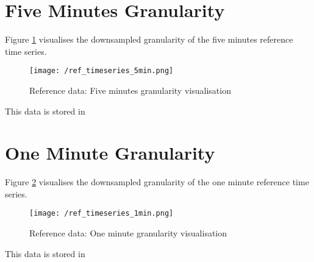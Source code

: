 \clearpage
\section{Five Minutes Granularity}

Figure \ref{fig:ref_ts_5_m_granularity} visualises the downsampled granularity of the five minutes reference time series.

\begin{figure}[h!]
	\texttt{[image: /ref\_timeseries\_5min.png]}
	\caption{Reference data: Five minutes granularity visualisation}
	\label{fig:ref_ts_5_m_granularity}
\end{figure}

This data is stored in 



\clearpage
\section{One Minute Granularity}

Figure \ref{fig:ref_ts_1_m_granularity} visualises the downsampled granularity of the one minute reference time series.

\begin{figure}[h!]
	\texttt{[image: /ref\_timeseries\_1min.png]}
	\caption{Reference data: One minute granularity visualisation}
	\label{fig:ref_ts_1_m_granularity}
\end{figure}

This data is stored in 



